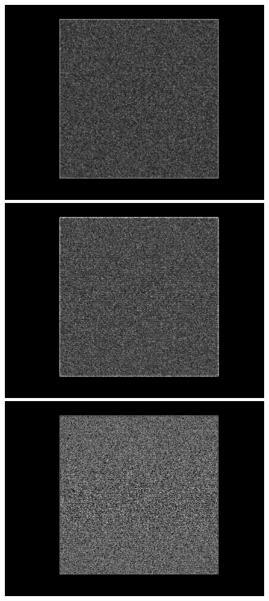 \documentclass[a4paper]{article} %
\begin{document}
\begin{figure}[!htb]
  \includegraphics[width=\linewidth]{sobel_Eq_Phantom_0p700_4_1_1.jpg}
\endminipage\hfill
{}%
  \includegraphics[width=\linewidth]{lap_Eq_Phantom_0p700_4_1_1.jpg}
\endminipage\hfill
{}%
  \includegraphics[width=\linewidth]{canny_Eq_Phantom_0p700_4_1_1.jpg}

\end{figure}
\end{document}
